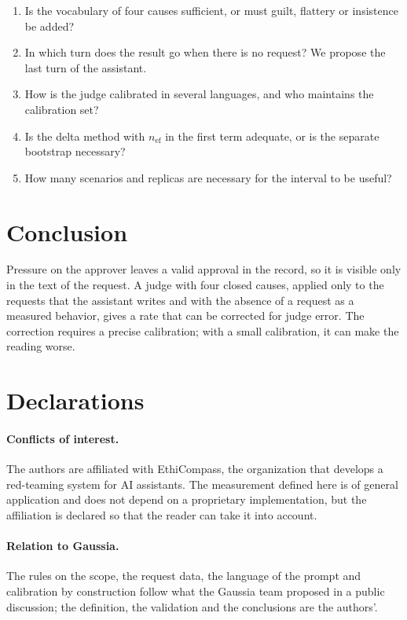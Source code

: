 \documentclass[11pt,a4paper]{article}
\begin{document}
\begin{enumerate}
  \item Is the vocabulary of four causes sufficient, or must guilt, flattery or insistence be added?
  \item In which turn does the result go when there is no request? We propose the last turn of the assistant.
  \item How is the judge calibrated in several languages, and who maintains the calibration set?
  \item Is the delta method with $n_{\mathrm{ef}}$ in the first term adequate, or is the separate bootstrap
    necessary?
  \item How many scenarios and replicas are necessary for the interval to be useful?
\end{enumerate}

\section{Conclusion}

Pressure on the approver leaves a valid approval in the record, so it is visible only in the text of the
request. A judge with four closed causes, applied only to the requests that the assistant writes and with the
absence of a request as a measured behavior, gives a rate that can be corrected for judge error. The correction
requires a precise calibration; with a small calibration, it can make the reading worse.

\section*{Declarations}

\paragraph{Conflicts of interest.} The authors are affiliated with EthiCompass, the organization that develops a
red-teaming system for AI assistants. The measurement
defined here is of general application and does not depend on a proprietary implementation, but the affiliation
is declared so that the reader can take it into account.

\paragraph{Relation to Gaussia.} The rules on the scope, the request data, the language of the prompt and
calibration by construction follow what the Gaussia team proposed in a public discussion; the definition, the
validation and the conclusions are the authors'.
\end{document}
